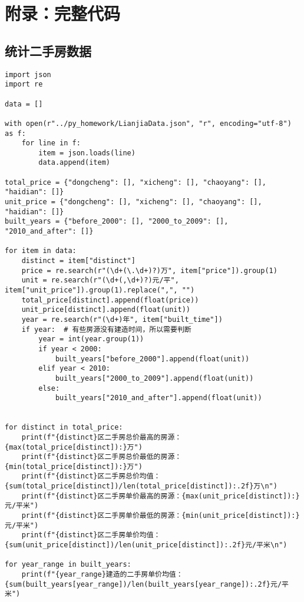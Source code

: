 \documentclass[lang=cn,11pt,a4paper]{elegantpaper}
\begin{document}
\section{附录：完整代码}

\subsection{统计二手房数据}
\begin{lstlisting}
import json
import re

data = []

with open(r"../py_homework/LianjiaData.json", "r", encoding="utf-8") as f:
    for line in f:
        item = json.loads(line)
        data.append(item)

total_price = {"dongcheng": [], "xicheng": [], "chaoyang": [], "haidian": []}
unit_price = {"dongcheng": [], "xicheng": [], "chaoyang": [], "haidian": []}
built_years = {"before_2000": [], "2000_to_2009": [], "2010_and_after": []}

for item in data:
    distinct = item["distinct"]
    price = re.search(r"(\d+(\.\d+)?)万", item["price"]).group(1)
    unit = re.search(r"(\d+(,\d+)?)元/平", item["unit_price"]).group(1).replace(",", "")
    total_price[distinct].append(float(price))
    unit_price[distinct].append(float(unit))
    year = re.search(r"(\d+)年", item["built_time"])
    if year:  # 有些房源没有建造时间，所以需要判断
        year = int(year.group(1))
        if year < 2000:
            built_years["before_2000"].append(float(unit))
        elif year < 2010:
            built_years["2000_to_2009"].append(float(unit))
        else:
            built_years["2010_and_after"].append(float(unit))


for distinct in total_price:
    print(f"{distinct}区二手房总价最高的房源：{max(total_price[distinct]):}万")
    print(f"{distinct}区二手房总价最低的房源：{min(total_price[distinct]):}万")
    print(f"{distinct}区二手房总价均值：{sum(total_price[distinct])/len(total_price[distinct]):.2f}万\n")
    print(f"{distinct}区二手房单价最高的房源：{max(unit_price[distinct]):}元/平米")
    print(f"{distinct}区二手房单价最低的房源：{min(unit_price[distinct]):}元/平米")
    print(f"{distinct}区二手房单价均值：{sum(unit_price[distinct])/len(unit_price[distinct]):.2f}元/平米\n")

for year_range in built_years:
    print(f"{year_range}建造的二手房单价均值：{sum(built_years[year_range])/len(built_years[year_range]):.2f}元/平米")
\end{lstlisting}
\end{document}
